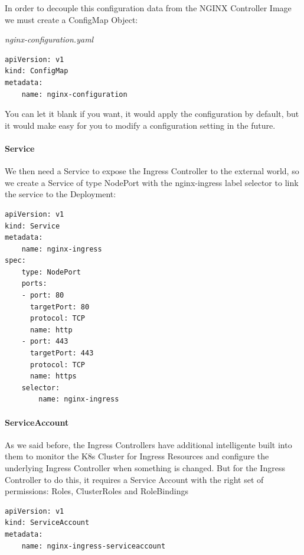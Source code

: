 \documentclass{article}
\newenvironment{codetemplate}[1][]{%
  \mybasecolorbox[#1]
  \itshape
}{%
  \endmybasecolorbox
}
\begin{document}
In order to decouple this configuration data from the NGINX Controller Image we must create a ConfigMap Object:

\begin{codetemplate}{nginx-configuration.yaml}
\begin{verbatim}
apiVersion: v1
kind: ConfigMap
metadata:
    name: nginx-configuration
\end{verbatim}
\end{codetemplate}

You can let it blank if you want, it would apply the configuration by default, but it would make easy for you to modify a configuration setting in the future.

\paragraph{Service}

We then need a Service to expose the Ingress Controller to the external world, so we create a Service of type NodePort with the nginx-ingress label selector to link the service to the Deployment:

\begin{codetemplate}{}
\begin{verbatim}
apiVersion: v1
kind: Service
metadata:
    name: nginx-ingress
spec:
    type: NodePort
    ports:
    - port: 80
      targetPort: 80
      protocol: TCP
      name: http
    - port: 443
      targetPort: 443
      protocol: TCP
      name: https
    selector:
        name: nginx-ingress
\end{verbatim}
\end{codetemplate}

\paragraph{ServiceAccount}

As we said before, the Ingress Controllers have additional intelligente built into them to monitor the K8s Cluster for Ingress Resources and configure the underlying Ingress Controller when something is changed. But for the Ingress Controller to do this, it requires a Service Account with the right set of permissions: Roles, ClusterRoles and RoleBindings

\begin{codetemplate}{}
\begin{verbatim}
apiVersion: v1
kind: ServiceAccount
metadata:
    name: nginx-ingress-serviceaccount
\end{verbatim}
\end{codetemplate}
\end{document}
